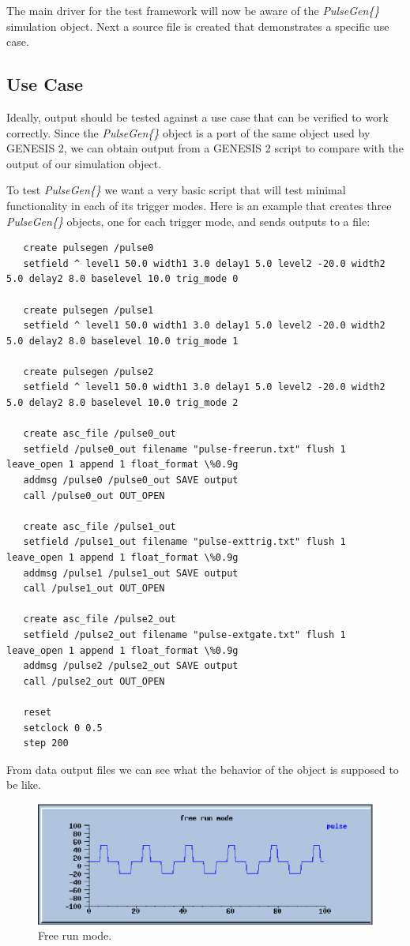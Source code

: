 \documentclass[12pt]{article}
\begin{document}
The main driver for the test framework will now be aware of the {\it PulseGen\{\}} simulation object. Next a source file is created that demonstrates a specific use case.

\subsection*{Use Case}

Ideally, output should be tested against a use case that can be verified to work correctly. Since the {\it PulseGen\{\}} object is a port of the same object used by GENESIS 2, we can obtain output from a GENESIS 2 script to compare with the output of our simulation object.

To test {\it PulseGen\{\}} we want a very basic script that will test minimal functionality in each of its trigger modes. Here is an example that creates three {\it PulseGen\{\}} objects, one for each trigger mode, and sends outputs to a file:
\begin{verbatim}
   create pulsegen /pulse0
   setfield ^ level1 50.0 width1 3.0 delay1 5.0 level2 -20.0 width2 5.0 delay2 8.0 baselevel 10.0 trig_mode 0

   create pulsegen /pulse1
   setfield ^ level1 50.0 width1 3.0 delay1 5.0 level2 -20.0 width2 5.0 delay2 8.0 baselevel 10.0 trig_mode 1

   create pulsegen /pulse2
   setfield ^ level1 50.0 width1 3.0 delay1 5.0 level2 -20.0 width2 5.0 delay2 8.0 baselevel 10.0 trig_mode 2

   create asc_file /pulse0_out 
   setfield /pulse0_out filename "pulse-freerun.txt" flush 1 leave_open 1 append 1 float_format \%0.9g
   addmsg /pulse0 /pulse0_out SAVE output
   call /pulse0_out OUT_OPEN

   create asc_file /pulse1_out 
   setfield /pulse1_out filename "pulse-exttrig.txt" flush 1 leave_open 1 append 1 float_format \%0.9g
   addmsg /pulse1 /pulse1_out SAVE output
   call /pulse1_out OUT_OPEN

   create asc_file /pulse2_out 
   setfield /pulse2_out filename "pulse-extgate.txt" flush 1 leave_open 1 append 1 float_format \%0.9g
   addmsg /pulse2 /pulse2_out SAVE output
   call /pulse2_out OUT_OPEN

   reset
   setclock 0 0.5
   step 200
\end{verbatim}

From data output files we can see what the behavior of the object is supposed to be like.

\begin{figure}[ht]
  \centering
    \includegraphics[scale=0.6]{figures/pulse0.eps}
  \caption{Free run mode.}
\end{figure}
\end{document}

